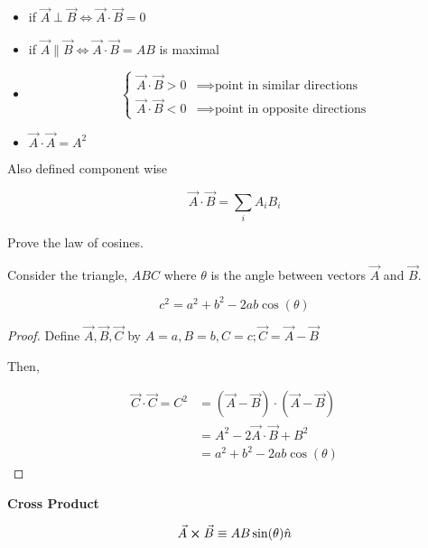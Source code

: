 \begin{itemize}
	\item if $\vec{A} \perp \vec{B} \iff \vec{A} \cdot \vec{B} = 0$
	\item if $\vec{A} \parallel \vec{B} \iff \vec{A} \cdot \vec{B} = AB$ is maximal
	\item \begin{equation*}
		\begin{cases}
			\vec{A} \cdot \vec{B} > 0 &\implies \text{point in similar directions}\\
			\vec{A} \cdot \vec{B} < 0 &\implies \text{point in opposite directions}
		\end{cases}
	\end{equation*}
	\item $\vec{A} \cdot \vec{A} = A^2$
\end{itemize}

Also defined component wise

\begin{equation}
	\vec A \cdot \vec B = \sum_i A_i B_i
\end{equation}

\begin{example}
	Prove the law of cosines.

	Consider the triangle, $ABC$ where $\theta$ is the angle between vectors $\vec{A}$ and $\vec{B}$.

	\begin{equation}
		c^2 = a^2 + b^2 - 2ab\cos(\theta)
	\end{equation}
\end{example}

\begin{proof}
	Define $\vec{A}, \vec{B}, \vec{C}$ by $A = a, B = b, C = c; \vec{C} = \vec{A} - \vec B$

	Then,

	\begin{align}
		\vec C \cdot \vec C = C^2 &= (\vec A - \vec B) \cdot (\vec A - \vec B)\\
		&= A^2 - 2 \vec A \cdot \vec B + B^2\\
		&= a^2 + b^2 - 2ab\cos(\theta)
	\end{align}
\end{proof}

\textbf{Cross Product}

\begin{equation}
	\vec A \cross \vec B \equiv AB\sin(\theta) \hat n
\end{equation}

